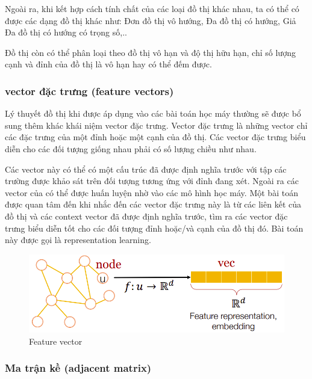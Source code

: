 Ngoài ra, khi kết hợp cách tính chất của các loại đồ thị khác nhau, ta có thể có được các dạng đồ thị khác như: Đơn đồ thị vô hướng, Đa đồ thị có hướng, Giả Đa đồ thị có hướng có trọng số,..

Đồ thị còn có thể phân loại theo đồ thị vô hạn và độ thị hữu hạn, chỉ số lượng cạnh và đỉnh của đồ thị là vô hạn hay có thể đếm được.

\subsubsection{vector đặc trưng (feature vectors)}

Lý thuyết đồ thị khi được áp dụng vào các bài toán học máy thường sẽ được bổ sung thêm khác khái niệm vector đặc trưng. Vector đặc trưng là những vector chỉ các đặc trưng của một đỉnh hoặc một cạnh của đồ thị. Các vector đặc trưng biểu diễn cho các đối tượng giống nhau phải có số lượng chiều như nhau.

Các vector này có thể có một cấu trúc đã được định nghĩa trước với tập các trường được khảo sát trên đối tượng tương ứng với đỉnh đang xét. Ngoài ra các vector của có thể được huấn luyện nhờ vào các mô hình học máy. Một bài toán được quan tâm đến khi nhắc đến các vector đặc trưng này là từ các liên kết của đồ thị và các context vector đã được định nghĩa trước, tìm ra các vector đặc trưng biểu diễn tốt cho các đối tượng đỉnh hoặc/và cạnh của đồ thị đó. Bài toán này được gọi là representation learning.

\begin{figure}[H]
    \begin{center}
        \includegraphics[scale=0.5]{images/feature-vector}
        \caption{Feature vector}
        \label{fig:feature-vector}
    \end{center}
\end{figure}


\subsubsection{Ma trận kề (adjacent matrix)}

